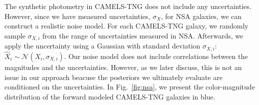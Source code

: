 The synthetic photometry in CAMELS-TNG does not include any uncertainties.
However, since we have measured uncertainties, $\sigma_X$, for NSA galaxies, we
can construct a realistic noise model. 
For each CAMELS-TNG galaxy, we randomly sample $\sigma_{X,i}$ from the range of
uncertainties measured in NSA. 
Afterwards, we apply the uncertainty using a Gaussian with standard deviation
$\sigma_{X,i}$: $\hat{X}_i \sim \mathcal{N}(X_i, \sigma_{X, i})$. 
Our noise model does not include correlations between the magnitudes and the
uncertainties. 
However, as we later discuss, this is not an issue in our approach beacuse the
posteriors we ultimately evaluate are conditioned on the uncertainties. 
In Fig.~\ref{fig:nsa}, we present the color-magnitude distribution of the
forward modeled CAMELS-TNG galaxies in blue. 
